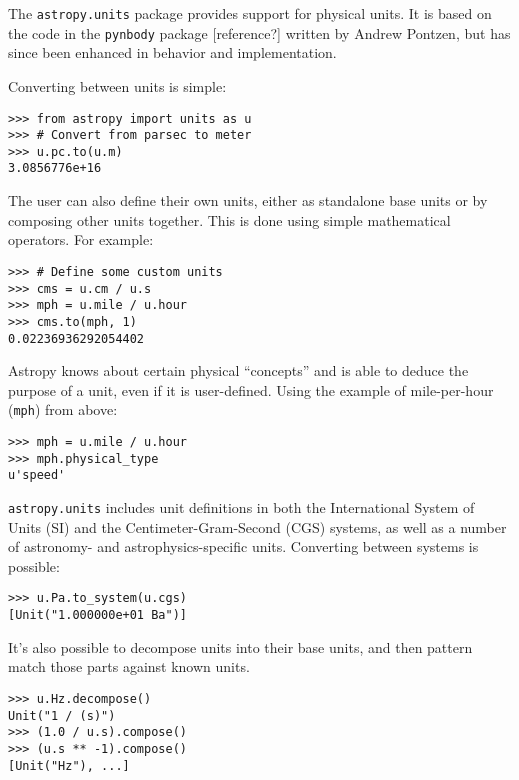 \documentclass[traditabstract]{aa}
\begin{document}

The \texttt{astropy.units} package provides support for physical
units.  It is based on the code in the \texttt{pynbody} package
[reference?]  written by Andrew Pontzen, but has since been enhanced
in behavior and implementation.

Converting between units is simple:
\begin{verbatim}
>>> from astropy import units as u
>>> # Convert from parsec to meter
>>> u.pc.to(u.m)
3.0856776e+16
\end{verbatim}
The user can also define their own units, either as standalone base
units or by composing other units together.  This is done using simple
mathematical operators.  For example:
\begin{verbatim}
>>> # Define some custom units
>>> cms = u.cm / u.s
>>> mph = u.mile / u.hour
>>> cms.to(mph, 1)
0.02236936292054402
\end{verbatim}

Astropy knows about certain physical ``concepts'' and is able to
deduce the purpose of a unit, even if it is user-defined.  Using the
example of mile-per-hour (\texttt{mph}) from above:
\begin{verbatim}
>>> mph = u.mile / u.hour
>>> mph.physical_type
u'speed'
\end{verbatim}

\texttt{astropy.units} includes unit definitions in both the
International System of Units (SI) and the Centimeter-Gram-Second
(CGS) systems, as well as a number of astronomy- and
astrophysics-specific units.  Converting between systems is possible:
\begin{verbatim}
>>> u.Pa.to_system(u.cgs)
[Unit("1.000000e+01 Ba")]
\end{verbatim}

It's also possible to decompose units into their base units, and then
pattern match those parts against known units.
\begin{verbatim}
>>> u.Hz.decompose()
Unit("1 / (s)")
>>> (1.0 / u.s).compose()
>>> (u.s ** -1).compose()
[Unit("Hz"), ...]
\end{verbatim}
\end{document}
